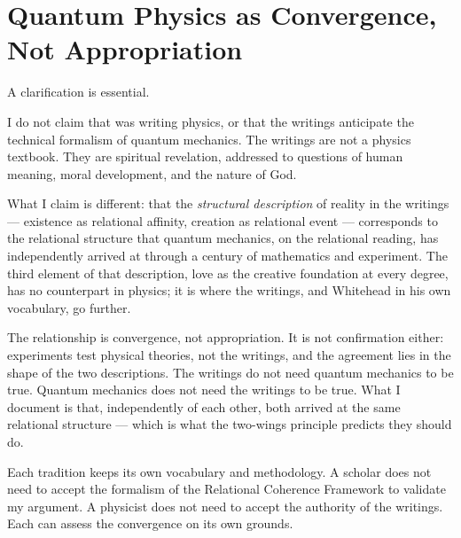 
\section{Quantum Physics as Convergence, Not Appropriation}
\label{sec:confirmation}


A clarification is essential.

I do not claim that \Bahaullah was writing physics, or that the
\bahai writings anticipate the technical formalism of quantum mechanics.
The writings are not a physics textbook.
They are spiritual revelation, addressed to questions of human meaning,
moral development, and the nature of God.

What I claim is different: that the \emph{structural description}
of reality in the \bahai writings --- existence as relational affinity, creation
as relational event --- corresponds to the relational structure that quantum
mechanics, on the relational reading, has independently arrived at through a
century of mathematics and experiment.
The third element of that description, love as the creative foundation at every
degree, has no counterpart in physics; it is where the writings, and Whitehead
in his own vocabulary, go further.

The relationship is convergence, not appropriation.
It is not confirmation either: experiments test physical theories, not the
writings, and the agreement lies in the shape of the two descriptions.
The \bahai writings do not need quantum mechanics to be true.
Quantum mechanics does not need the \bahai writings to be true.
What I document is that, independently of each other, both arrived at
the same relational structure --- which is what the two-wings principle predicts they should do.

Each tradition keeps its own vocabulary and methodology.
A \bahai scholar does not need to accept the formalism of the Relational Coherence
Framework to validate my argument.
A physicist does not need to accept the authority of the \bahai writings.
Each can assess the convergence on its own grounds.
